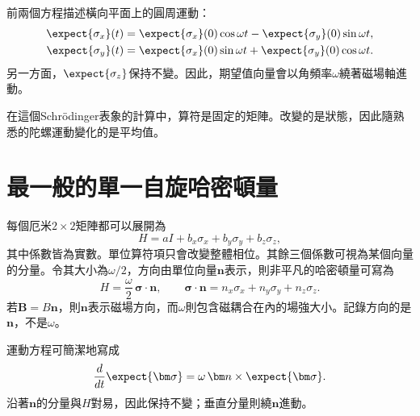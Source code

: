 前兩個方程描述橫向平面上的圓周運動：
\begin{align}
\expect{\sigma_x}(t)
&=\expect{\sigma_x}(0)\cos\omega t
-\expect{\sigma_y}(0)\sin\omega t,\\
\expect{\sigma_y}(t)
&=\expect{\sigma_x}(0)\sin\omega t
+\expect{\sigma_y}(0)\cos\omega t.
\end{align}
另一方面，\(\expect{\sigma_z}\)保持不變。因此，期望值向量會以角頻率\(\omega\)繞著磁場軸進動。

在這個Schr\"odinger表象的計算中，算符是固定的矩陣。改變的是狀態，因此隨熟悉的陀螺運動變化的是平均值。

\begin{classroomqa}
\end{classroomqa}

\section{最一般的單一自旋哈密頓量}

每個厄米\(2\times2\)矩陣都可以展開為
\begin{equation}
H=aI+b_x\sigma_x+b_y\sigma_y+b_z\sigma_z,
\end{equation}
其中係數皆為實數。單位算符項只會改變整體相位。其餘三個係數可視為某個向量的分量。令其大小為\(\omega/2\)，方向由單位向量\(\bm n\)表示，則非平凡的哈密頓量可寫為
\begin{equation}
H=\frac{\omega}{2}\,\bm\sigma\cdot\bm n,
\qquad
\bm\sigma\cdot\bm n
=n_x\sigma_x+n_y\sigma_y+n_z\sigma_z.
\label{eq:l5-general-spin-h}
\end{equation}
若\(\bm B=B\bm n\)，則\(\bm n\)表示磁場方向，而\(\omega\)則包含磁耦合在內的場強大小。記錄方向的是\(\bm n\)，不是\(\omega\)。

運動方程可簡潔地寫成
\begin{equation}
\frac{d}{dt}\expect{\bm\sigma}
=\omega\,\bm n\times\expect{\bm\sigma}.
\end{equation}
沿著\(\bm n\)的分量與\(H\)對易，因此保持不變；垂直分量則繞\(\bm n\)進動。

\begin{classroomqa}
\end{classroomqa}

